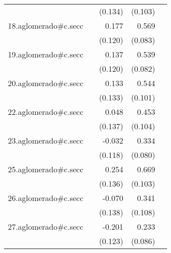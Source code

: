 {\begin{longtable}{l*{4}{D{.}{.}{-1}}}
            &                     &     (0.134)         &     (0.103)         &                     \\
\addlinespace
18.aglomerado#c.secc&                     &       0.177         &       0.569\sym{***}&                     \\
            &                     &     (0.120)         &     (0.083)         &                     \\
\addlinespace
19.aglomerado#c.secc&                     &       0.137         &       0.539\sym{***}&                     \\
            &                     &     (0.120)         &     (0.082)         &                     \\
\addlinespace
20.aglomerado#c.secc&                     &       0.133         &       0.544\sym{***}&                     \\
            &                     &     (0.133)         &     (0.101)         &                     \\
\addlinespace
22.aglomerado#c.secc&                     &       0.048         &       0.453\sym{***}&                     \\
            &                     &     (0.137)         &     (0.104)         &                     \\
\addlinespace
23.aglomerado#c.secc&                     &      -0.032         &       0.334\sym{***}&                     \\
            &                     &     (0.118)         &     (0.080)         &                     \\
\addlinespace
25.aglomerado#c.secc&                     &       0.254         &       0.669\sym{***}&                     \\
            &                     &     (0.136)         &     (0.103)         &                     \\
\addlinespace
26.aglomerado#c.secc&                     &      -0.070         &       0.341\sym{**} &                     \\
            &                     &     (0.138)         &     (0.108)         &                     \\
\addlinespace
27.aglomerado#c.secc&                     &      -0.201         &       0.233\sym{**} &                     \\
            &                     &     (0.123)         &     (0.086)         &                     \\

\end{longtable}}
